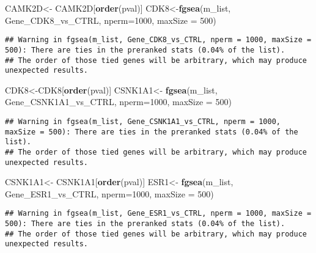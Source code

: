 \documentclass[]{article}
\newenvironment{Shaded}{\begin{snugshade}}{\end{snugshade}}
\newcommand{\KeywordTok}[1]{\textcolor[rgb]{0.13,0.29,0.53}{\textbf{#1}}}
\newcommand{\DataTypeTok}[1]{\textcolor[rgb]{0.13,0.29,0.53}{#1}}
\newcommand{\DecValTok}[1]{\textcolor[rgb]{0.00,0.00,0.81}{#1}}
\newcommand{\StringTok}[1]{\textcolor[rgb]{0.31,0.60,0.02}{#1}}
\newcommand{\NormalTok}[1]{#1}
\begin{document}
\begin{Shaded}
\begin{Highlighting}[]
\NormalTok{CAMK2D<-}\StringTok{ }\NormalTok{CAMK2D[}\KeywordTok{order}\NormalTok{(pval)]}
\NormalTok{CDK8<-}\KeywordTok{fgsea}\NormalTok{(m_list, Gene_CDK8_vs_CTRL, }\DataTypeTok{nperm=}\DecValTok{1000}\NormalTok{, }\DataTypeTok{maxSize =} \DecValTok{500}\NormalTok{)}
\end{Highlighting}
\end{Shaded}

\begin{verbatim}
## Warning in fgsea(m_list, Gene_CDK8_vs_CTRL, nperm = 1000, maxSize = 500): There are ties in the preranked stats (0.04% of the list).
## The order of those tied genes will be arbitrary, which may produce unexpected results.
\end{verbatim}

\begin{Shaded}
\begin{Highlighting}[]
\NormalTok{CDK8<-CDK8[}\KeywordTok{order}\NormalTok{(pval)]}
\NormalTok{CSNK1A1<-}\StringTok{ }\KeywordTok{fgsea}\NormalTok{(m_list, Gene_CSNK1A1_vs_CTRL, }\DataTypeTok{nperm=}\DecValTok{1000}\NormalTok{, }\DataTypeTok{maxSize =} \DecValTok{500}\NormalTok{)}
\end{Highlighting}
\end{Shaded}

\begin{verbatim}
## Warning in fgsea(m_list, Gene_CSNK1A1_vs_CTRL, nperm = 1000, maxSize = 500): There are ties in the preranked stats (0.04% of the list).
## The order of those tied genes will be arbitrary, which may produce unexpected results.
\end{verbatim}

\begin{Shaded}
\begin{Highlighting}[]
\NormalTok{CSNK1A1<-}\StringTok{ }\NormalTok{CSNK1A1[}\KeywordTok{order}\NormalTok{(pval)]}
\NormalTok{ESR1<-}\StringTok{ }\KeywordTok{fgsea}\NormalTok{(m_list, Gene_ESR1_vs_CTRL, }\DataTypeTok{nperm=}\DecValTok{1000}\NormalTok{, }\DataTypeTok{maxSize =} \DecValTok{500}\NormalTok{)}
\end{Highlighting}
\end{Shaded}

\begin{verbatim}
## Warning in fgsea(m_list, Gene_ESR1_vs_CTRL, nperm = 1000, maxSize = 500): There are ties in the preranked stats (0.04% of the list).
## The order of those tied genes will be arbitrary, which may produce unexpected results.
\end{verbatim}
\end{document}
